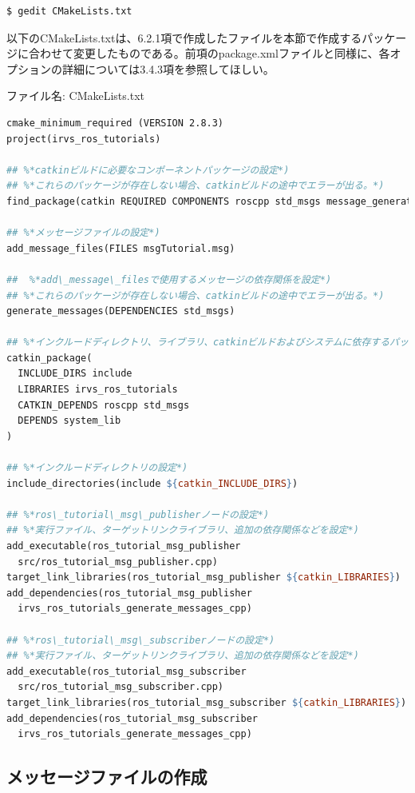 \begin{lstlisting}[language=ROS]
$ gedit CMakeLists.txt
\end{lstlisting}

以下のCMakeLists.txtは、6.2.1項で作成したファイルを本節で作成するパッケージに合わせて変更したものである。前項のpackage.xmlファイルと同様に、各オプションの詳細については3.4.3項を参照してほしい。

ファイル名: CMakeLists.txt
\begin{lstlisting}[language=make]
cmake_minimum_required (VERSION 2.8.3)
project(irvs_ros_tutorials)

## %*catkinビルドに必要なコンポーネントパッケージの設定*)
## %*これらのパッケージが存在しない場合、catkinビルドの途中でエラーが出る。*)
find_package(catkin REQUIRED COMPONENTS roscpp std_msgs message_generation)

## %*メッセージファイルの設定*)
add_message_files(FILES msgTutorial.msg)

##  %*add\_message\_filesで使用するメッセージの依存関係を設定*)
## %*これらのパッケージが存在しない場合、catkinビルドの途中でエラーが出る。*)
generate_messages(DEPENDENCIES std_msgs)

## %*インクルードディレクトリ、ライブラリ、catkinビルドおよびシステムに依存するパッケージの指定*)
catkin_package(
  INCLUDE_DIRS include
  LIBRARIES irvs_ros_tutorials
  CATKIN_DEPENDS roscpp std_msgs
  DEPENDS system_lib
)

## %*インクルードディレクトリの設定*)
include_directories(include ${catkin_INCLUDE_DIRS})

## %*ros\_tutorial\_msg\_publisherノードの設定*)
## %*実行ファイル、ターゲットリンクライブラリ、追加の依存関係などを設定*)
add_executable(ros_tutorial_msg_publisher
  src/ros_tutorial_msg_publisher.cpp)
target_link_libraries(ros_tutorial_msg_publisher ${catkin_LIBRARIES})
add_dependencies(ros_tutorial_msg_publisher
  irvs_ros_tutorials_generate_messages_cpp)

## %*ros\_tutorial\_msg\_subscriberノードの設定*)
## %*実行ファイル、ターゲットリンクライブラリ、追加の依存関係などを設定*)
add_executable(ros_tutorial_msg_subscriber
  src/ros_tutorial_msg_subscriber.cpp)
target_link_libraries(ros_tutorial_msg_subscriber ${catkin_LIBRARIES})
add_dependencies(ros_tutorial_msg_subscriber
  irvs_ros_tutorials_generate_messages_cpp)
\end{lstlisting}

\subsection{メッセージファイルの作成}

